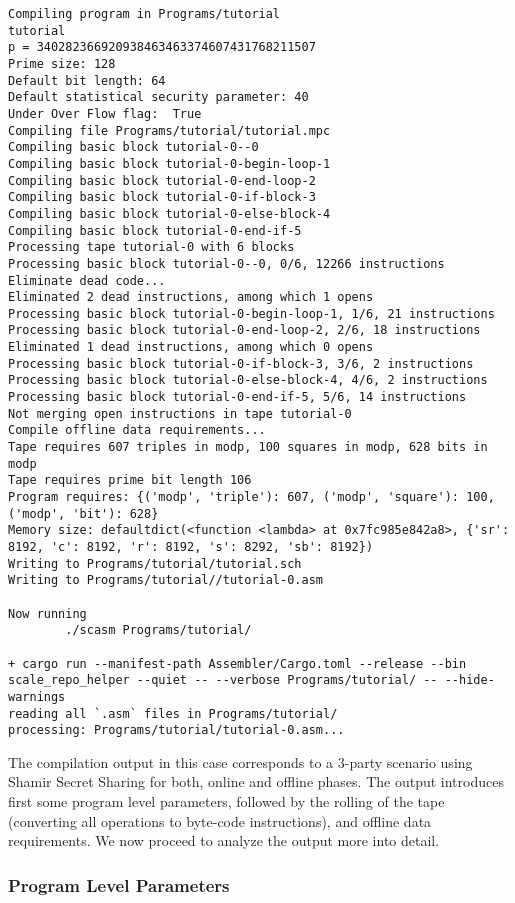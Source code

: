 \begin{verbatim}
Compiling program in Programs/tutorial
tutorial
p = 340282366920938463463374607431768211507
Prime size: 128
Default bit length: 64
Default statistical security parameter: 40
Under Over Flow flag:  True
Compiling file Programs/tutorial/tutorial.mpc
Compiling basic block tutorial-0--0
Compiling basic block tutorial-0-begin-loop-1
Compiling basic block tutorial-0-end-loop-2
Compiling basic block tutorial-0-if-block-3
Compiling basic block tutorial-0-else-block-4
Compiling basic block tutorial-0-end-if-5
Processing tape tutorial-0 with 6 blocks
Processing basic block tutorial-0--0, 0/6, 12266 instructions
Eliminate dead code...
Eliminated 2 dead instructions, among which 1 opens
Processing basic block tutorial-0-begin-loop-1, 1/6, 21 instructions
Processing basic block tutorial-0-end-loop-2, 2/6, 18 instructions
Eliminated 1 dead instructions, among which 0 opens
Processing basic block tutorial-0-if-block-3, 3/6, 2 instructions
Processing basic block tutorial-0-else-block-4, 4/6, 2 instructions
Processing basic block tutorial-0-end-if-5, 5/6, 14 instructions
Not merging open instructions in tape tutorial-0
Compile offline data requirements...
Tape requires 607 triples in modp, 100 squares in modp, 628 bits in modp
Tape requires prime bit length 106
Program requires: {('modp', 'triple'): 607, ('modp', 'square'): 100, ('modp', 'bit'): 628}
Memory size: defaultdict(<function <lambda> at 0x7fc985e842a8>, {'sr': 8192, 'c': 8192, 'r': 8192, 's': 8292, 'sb': 8192})
Writing to Programs/tutorial/tutorial.sch
Writing to Programs/tutorial//tutorial-0.asm

Now running
        ./scasm Programs/tutorial/

+ cargo run --manifest-path Assembler/Cargo.toml --release --bin scale_repo_helper --quiet -- --verbose Programs/tutorial/ -- --hide-warnings
reading all `.asm` files in Programs/tutorial/
processing: Programs/tutorial/tutorial-0.asm...
\end{verbatim}
The compilation output in this case corresponds  to a 3-party scenario using Shamir Secret Sharing for both, online and offline phases.
The output introduces first some program level parameters, followed by the rolling of the tape (converting all operations to byte-code instructions), and offline data requirements. We now proceed to analyze the output more into detail.

\subsubsection{Program Level Parameters}

